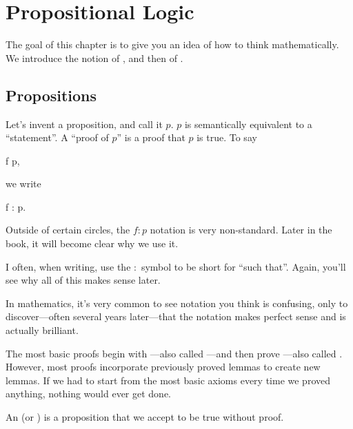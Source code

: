 \chapter{Propositional Logic}
\label{propositions}

The goal of this chapter is to give you an idea of how to think
mathematically. We introduce the notion of , and
then of .

\section{Propositions}

Let's invent a proposition, and call it $p$. $p$ is semantically
equivalent to a ``statement''. A ``proof of $p$'' is a proof that $p$
is true. To say

\begin{zz}
  f  p,
\end{zz}

we write

\begin{zz}
  f : p.
\end{zz}

\begin{remark}
  Outside of certain circles, the $f : p$ notation is very
  non-standard. Later in the book, it will become clear why we use it.

  I often, when writing, use the $:$ symbol to be short for ``such
  that''. Again, you'll see why all of this makes sense later.
\end{remark}

\begin{aside}
  In mathematics, it's very common to see notation you think is
  confusing, only to discover---often several years later---that the
  notation makes perfect sense and is actually brilliant.
\end{aside}

The most basic proofs begin with ---also called
---and then prove ---also called
. However, most proofs incorporate previously proved
lemmas to create new lemmas. If we had to start from the most basic
axioms every time we proved anything, nothing would ever get done.

\begin{definition}
  \label{def:axiom}
  \label{def:postulate}
  An  (or ) is a proposition that we
  accept to be true without proof.
\end{definition}

